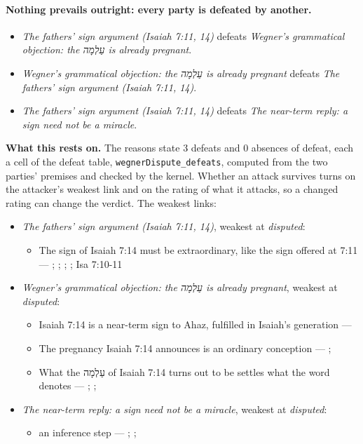 \documentclass[11pt]{article}
\begin{document}
\paragraph{Nothing prevails outright: every party is defeated by another.}
\begin{itemize}
\item \emph{The fathers' sign argument (Isaiah 7:11, 14)} defeats \emph{Wegner's grammatical objection: the עַלְמָה is already pregnant}.
\item \emph{Wegner's grammatical objection: the עַלְמָה is already pregnant} defeats \emph{The fathers' sign argument (Isaiah 7:11, 14)}.
\item \emph{The fathers' sign argument (Isaiah 7:11, 14)} defeats \emph{The near-term reply: a sign need not be a miracle}.
\end{itemize}
\par\noindent\textbf{What this rests on.} The reasons state 3 defeats and 0 absences of defeat, each a cell of the defeat table, \texttt{wegner\allowbreak{}Dispute\_\allowbreak{}defeats}, computed from the two parties' premises and checked by the kernel. Whether an attack survives turns on the attacker's weakest link and on the rating of what it attacks, so a changed rating can change the verdict. The weakest links:
\begin{itemize}
\item \emph{The fathers' sign argument (Isaiah 7:11, 14)}, weakest at \emph{disputed}:
\begin{itemize}
\item The sign of Isaiah 7:14 must be extraordinary, like the sign offered at 7:11 --- \cite[I.35]{origen-against-celsus-248}; \cite[84]{justin-dialogue-with-trypho-160}; \cite[III.21.6]{irenaeus-against-heresies-180}; \cite[474]{postell-isaiah-messianic-2025}; Isa 7:10-11
\end{itemize}
\item \emph{Wegner's grammatical objection: the עַלְמָה is already pregnant}, weakest at \emph{disputed}:
\begin{itemize}
\item Isaiah 7:14 is a near-term sign to Ahaz, fulfilled in Isaiah's generation --- \cite{brown-birth-messiah-1993}
\item The pregnancy Isaiah 7:14 announces is an ordinary conception --- \cite[476--478]{wegner-virgin-births-2011}; \cite[474]{postell-isaiah-messianic-2025}
\item What the עַלְמָה of Isaiah 7:14 turns out to be settles what the word denotes --- \cite[471--472]{wegner-virgin-births-2011}; \cite[468]{postell-isaiah-messianic-2025}; \cite[152]{rico-gentry-infant-king-2020}
\end{itemize}
\item \emph{The near-term reply: a sign need not be a miracle}, weakest at \emph{disputed}:
\begin{itemize}
\item an inference step --- \cite[64--65]{rhodea-did-matthew-conceive-2013}; \cite[469--470]{wegner-virgin-births-2011}; \cite[474]{postell-isaiah-messianic-2025}
\end{itemize}
\end{itemize}
\end{document}
